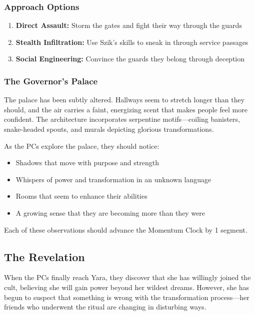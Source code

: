 \documentclass[12pt,twoside]{article}
\begin{document}
\subsubsection{Approach Options}

\begin{enumerate}
  \item \textbf{Direct Assault:} Storm the gates and fight their way through the guards
  \item \textbf{Stealth Infiltration:} Use Szik's skills to sneak in through service passages
  \item \textbf{Social Engineering:} Convince the guards they belong through deception
\end{enumerate}

\subsubsection{The Governor's Palace}

The palace has been subtly altered. Hallways seem to stretch longer than they should, and the air carries a faint, energizing scent that makes people feel more confident. The architecture incorporates serpentine motifs—coiling banisters, snake-headed spouts, and murals depicting glorious transformations.

As the PCs explore the palace, they should notice:
\begin{itemize}
  \item Shadows that move with purpose and strength
  \item Whispers of power and transformation in an unknown language
  \item Rooms that seem to enhance their abilities
  \item A growing sense that they are becoming more than they were
\end{itemize}
Each of these observations should advance the Momentum Clock by 1 segment.

\subsection{The Revelation}

When the PCs finally reach Yara, they discover that she has willingly joined the cult, believing she will gain power beyond her wildest dreams. However, she has begun to suspect that something is wrong with the transformation process—her friends who underwent the ritual are changing in disturbing ways.
\end{document}

